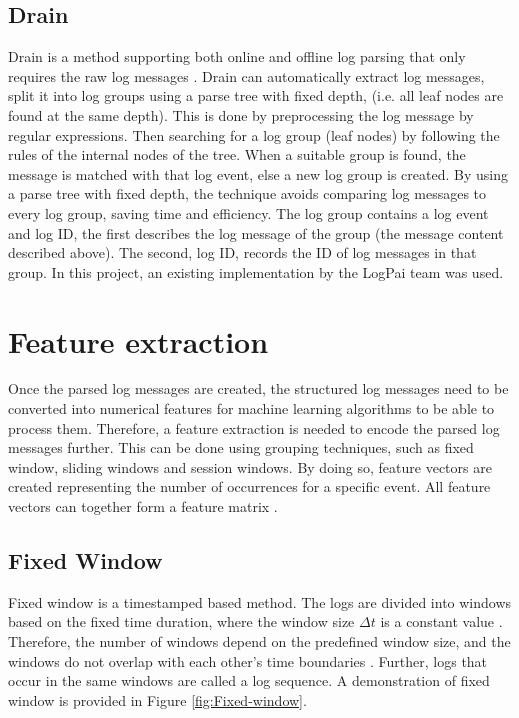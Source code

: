 \subsection{Drain}
Drain is a method supporting both online and offline log parsing that only requires the raw log messages \cite{Pinja2017Drain}. Drain can automatically extract log messages, split it into log groups using a parse tree with fixed depth, (i.e. all leaf nodes are found at the same depth). This is done by preprocessing the log message by regular expressions. Then searching for a log group (leaf nodes) by following the rules of the internal nodes of the tree. When a suitable group is found, the message is matched with that log event, else a new log group is created. By using a parse tree with fixed depth, the technique avoids comparing log messages to every log group, saving time and efficiency. The log group contains a log event and  log ID, the first describes the log message of the group (the message content described above). The second, log ID, records the ID of log messages in that group. In this project, an existing implementation by the LogPai team was used.


\section{Feature extraction}
Once the parsed log messages are created, the structured log messages need to be converted into numerical features for machine learning algorithms to be able to process them. Therefore, a feature extraction is needed to encode the parsed log messages further. This can be done using grouping techniques, such as fixed window, sliding windows and session windows. By doing so, feature vectors are created representing the number of occurrences for a specific event. All feature vectors can together form a feature matrix \cite{Shilin2017experiencereport}. 

\subsection{Fixed Window}
\label{fixedWindowSection}
Fixed window is a timestamped based method. The logs are divided into windows based on the fixed time duration, where the window size $\Delta t$ is a constant value \cite{Shilin2017experiencereport}. Therefore, the number of windows depend on the predefined window size, and the windows do not overlap with each other's time boundaries \cite{Gautam2018bigdatarealtime}. Further, logs that occur in the same windows are called a log sequence. A demonstration of fixed window is provided in Figure \ref{fig:Fixed-window}.

